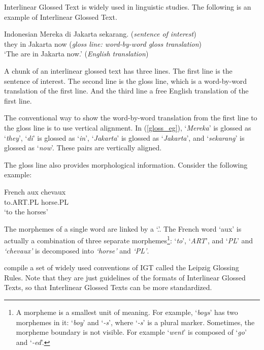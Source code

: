 \documentclass[final]{ua-thesis}
\numberwithin{equation}{section}
\begin{document}
Interlinear Glossed Text is widely used in linguistic studies. The following is an example of Interlinear Glossed Text.
\begin{exe}  
\ex\label{gloss_eg} Indonesian \citep[p. 237]{sneddon2012indonesian}
	\gll   Mereka di Jakarta sekarang. (\textit{sentence of interest})\\
     	   they in Jakarta now (\textit{gloss line: word-by-word gloss translation})\\
    \glt   `The are in Jakarta now.' (\textit{English translation})  
\end{exe}

A chunk of an interlinear glossed text has three lines. The first line is the sentence of interest. The second line is the gloss line, which is a word-by-word translation of the first line. And the third line a free English translation of the first line.

The conventional way to show the word-by-word translation from the first line to the gloss line is to use vertical alignment. In (\ref{gloss_eg}), `\textit{Mereka}' is glossed as `\textit{they}', `\textit{di}' is glossed as `\textit{in}', `\textit{Jakarta}' is glossed as `\textit{Jakarta}', and `\textit{sekarang}' is glossed as `\textit{now}'. These pairs are vertically aligned. 

The gloss line also provides morphological information. Consider the following example:

\begin{exe}  
\ex French
	\gll   aux chevaux\\
     	   to.ART.PL horse.PL \\
    \glt   `to the horses'  
\end{exe}

The morphemes of a single word are linked by a `.'. The French word `aux' is actually a combination of three separate morphemes\footnote{A morpheme is a smallest unit of meaning. For example, `\textit{boys}' has two morphemes in it: `\textit{boy}' and `\textit{-s}', where `\textit{-s}' is a plural marker. Sometimes, the morpheme boundary is not visible. For example `\textit{went}' is composed of `\textit{go}' and `\textit{-ed}'.}: `\textit{to}', `\textit{ART}', and `\textit{PL}' and \textit{`chevaux'} is decomposed into \textit{`horse'} and \textit{`PL'}.

\citet{bickel2008leipzig} compile a set of widely used conventions of IGT called the Leipzig Glossing Rules.
Note that they are just guidelines of the formats of Interlinear Glossed Texts, so that Interlinear Glossed Texts can be more standardized. 
\end{document}
